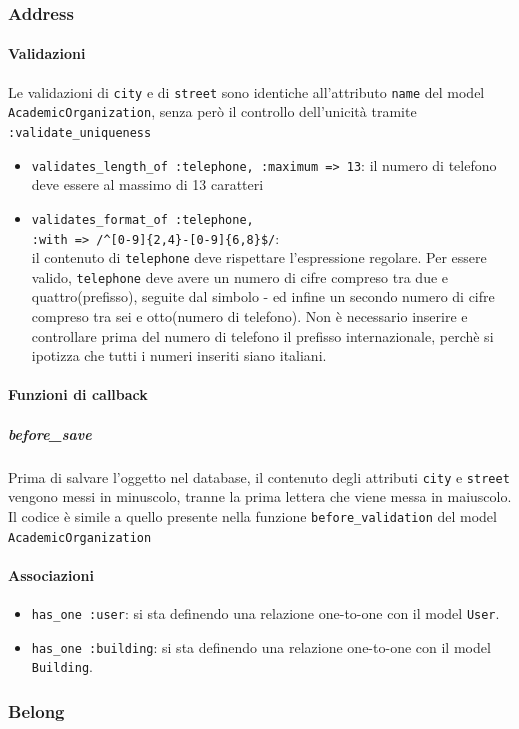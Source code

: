 \documentclass[11pt,a4paper]{article}
\begin{document}
\subsubsection{Address}
\paragraph{Validazioni}
Le validazioni di \verb|city| e di \verb|street| sono identiche all'attributo \verb|name| del model \verb|AcademicOrganization|, senza però il controllo dell'unicità tramite \verb|:validate_uniqueness|
\begin{itemize}
 \item \verb|validates_length_of :telephone, :maximum => 13|: il numero di telefono deve essere al massimo di 13 caratteri
 \item \verb|validates_format_of :telephone,|\\ 
      \verb|:with => /^[0-9]{2,4}-[0-9]{6,8}$/|:\\ il contenuto di \verb|telephone| deve rispettare l'espressione regolare. Per essere valido, \verb|telephone| deve avere un numero di cifre compreso tra due e quattro(prefisso), seguite dal simbolo - ed infine un secondo numero di cifre compreso tra sei e otto(numero di telefono). Non è necessario inserire e controllare prima del numero di telefono il prefisso internazionale, perchè si ipotizza che tutti i numeri inseriti siano italiani.
\end{itemize}
\paragraph{Funzioni di callback}
\subparagraph{before\_save}
Prima di salvare l'oggetto nel database, il contenuto degli attributi \verb|city| e \verb|street| vengono messi in minuscolo, tranne la prima lettera che viene messa in maiuscolo. Il codice è simile a quello presente nella funzione \verb|before_validation| del model \verb|AcademicOrganization| 
\paragraph{Associazioni}
\begin{itemize}
 \item \verb|has_one :user|: si sta definendo una relazione one-to-one con il model \verb|User|. 
 \item \verb|has_one :building|: si sta definendo una relazione one-to-one con il model \verb|Building|.
\end{itemize}
\subsubsection{Belong}
\end{document}
